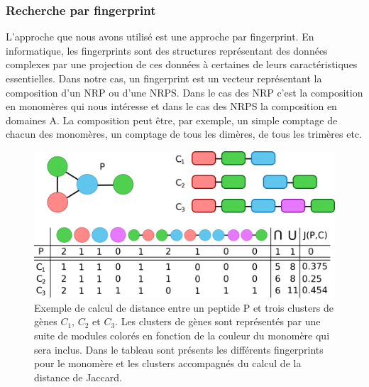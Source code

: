 \subsubsection{Recherche par fingerprint}

L'approche que nous avons utilisé est une approche par fingerprint.
En informatique, les fingerprints sont des structures représentant des données complexes par une projection de ces données à certaines de leurs caractéristiques essentielles.
Dans notre cas, un fingerprint est un vecteur représentant la composition d'un NRP ou d'une NRPS.
Dans le cas des NRP c'est la composition en monomères qui nous intéresse et dans le cas des NRPS la composition en domaines A.
La composition peut être, par exemple, un simple comptage de chacun des monomères, un comptage de tous les dimères, de tous les trimères etc.

\begin{figure}[h!]
  \begin{center}
    \includegraphics[width=450px]{Figures/synthese/fingerprints.png}
    \caption{\label{jaccard}Exemple de calcul de distance entre un peptide P et trois clusters de gènes $C_1$, $C_2$ et $C_3$.
    Les clusters de gènes sont représentés par une suite de modules colorés en fonction de la couleur du monomère qui sera inclus.
    Dans le tableau sont présents les différents fingerprints pour le monomère et les clusters accompagnés du calcul de la distance de Jaccard.}
  \end{center}
\end{figure}

